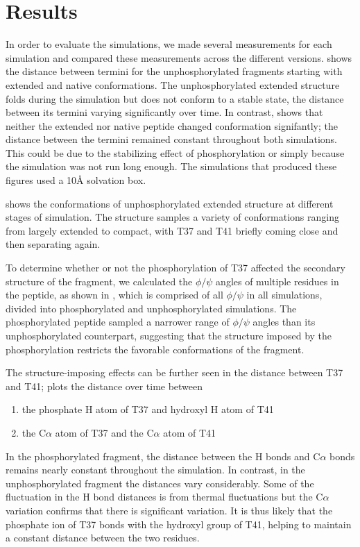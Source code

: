 \section{Results} %
\label{sec:results}


In order to evaluate the simulations, we made several measurements for each simulation and compared these measurements across the different versions.
 shows the distance between termini for the unphosphorylated fragments starting with extended and native conformations.
The unphosphorylated extended structure folds during the simulation but does not conform to a stable state,
the distance between its termini varying significantly over time.
In contrast,  shows that neither the extended nor native peptide changed conformation signifantly;
the distance between the termini remained constant throughout both simulations.
This could be due to the stabilizing effect of phosphorylation or simply because the simulation was not run long enough.
The simulations that produced these figures used a 10{\AA} solvation box.

 shows the conformations of unphosphorylated extended structure at different stages of simulation.
The structure samples a variety of conformations ranging from largely extended to compact, with T37 and T41 briefly coming close and then separating again.

To determine whether or not the phosphorylation of T37 affected the secondary structure of the fragment,
we calculated the $\phi/\psi$ angles of multiple residues in the peptide, as shown in ,
which is comprised of all $\phi/\psi$ in all simulations, divided into phosphorylated and unphosphorylated simulations.
The phosphorylated peptide sampled a narrower range of $\phi/\psi$ angles than its unphosphorylated counterpart,
suggesting that the structure imposed by the phosphorylation restricts the favorable conformations of the fragment.

The structure-imposing effects can be further seen in the distance between T37 and T41;
 plots the distance over time between
\begin{enumerate} \itemsep 1pt
  \item the phosphate H atom of T37 and hydroxyl H atom of T41
  \item the C$\alpha$ atom of T37 and the C$\alpha$ atom of T41
\end{enumerate}
In the phosphorylated fragment, the distance between the H bonds and C$\alpha$ bonds remains nearly constant throughout the simulation.
In contrast, in the unphosphorylated fragment the distances vary considerably.
Some of the fluctuation in the H bond distances is from thermal fluctuations but the C$\alpha$ variation confirms that there is significant variation.
It is thus likely that the phosphate ion of T37 bonds with the hydroxyl group of T41, helping to maintain a constant distance between the two residues.

